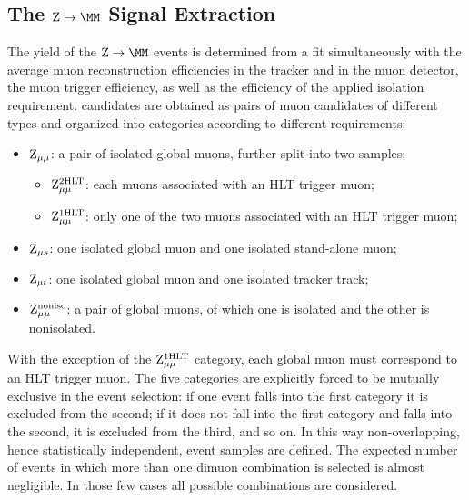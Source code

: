 
\subsection{\texorpdfstring{The $\Zmm$ Signal Extraction}{The Z->mu mu Signal Extraction}}
\label{sec:Zmumu}

The yield of the $\Zmm$ events is determined from a fit simultaneously with the
average muon reconstruction efficiencies in the tracker and in
the muon detector, the muon trigger efficiency,
as well as the efficiency of the applied isolation requirement.
\Zmm candidates are obtained as pairs of muon candidates of different types
and organized into categories according to different requirements:
\begin{itemize}
\item $\mathrm{Z}_{\mu\mu}$: a pair of isolated global muons, further split into two samples:
\begin{itemize}
\item $\mathrm{Z}_{\mu\mu}^{2\mathrm{HLT}}$: each muons associated with an HLT trigger muon;
\item $\mathrm{Z}_{\mu\mu}^{1\mathrm{HLT}}$: only one of the two muons associated with an HLT trigger muon;
\end{itemize}
\item $\mathrm{Z}_{\mu s}$: one isolated global muon and one isolated
  stand-alone muon;
\item $\mathrm{Z}_{\mu t}$: one isolated global muon and one isolated tracker track;
\item $\mathrm{Z}_{\mu\mu}^{\mathrm{noniso}}$: a pair of global muons, of which one is isolated and the
other is nonisolated.
\end{itemize}

With the exception of the $\mathrm{Z}_{\mu\mu}^{1\mathrm{HLT}}$ category, each global muon must correspond to an HLT trigger muon.
The five categories are explicitly forced to be mutually exclusive in the event
selection: if one event falls into the first category it is excluded from the second;
if it does not fall into the first category and falls into the second, it is excluded
from the third, and so on. In this way non-overlapping, hence statistically
independent, event samples are defined. The expected number of events in which more than
one dimuon combination is selected is almost negligible.
In those few cases all possible combinations are considered.

